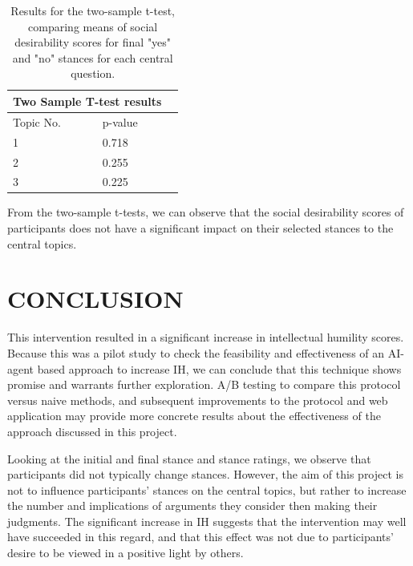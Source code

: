\documentclass[journal]{IEEEtran}
\begin{document}
\begin{table}[ht]
    \centering
    \begin{tabular}{llr}
\hline
\multicolumn{2}{c}{\textbf{Two Sample T-test results}} \\
\hline
Topic No.    & p-value \\
\hline
1   &   0.718   \\
2   &   0.255   \\
3   &   0.225   \\
\hline
\end{tabular}
    \caption{Results for the two-sample t-test, comparing means of social desirability scores for final "yes" and "no" stances for each central question.}
    \label{tab:twosample-ttest-post-results}
\end{table}

From the two-sample t-tests, we can observe that the social desirability scores of participants does not have a significant impact on their selected stances to the central topics.


\section{CONCLUSION}

This intervention resulted in a significant increase in intellectual humility scores. Because this was a pilot study to check the feasibility and effectiveness of an AI-agent based approach to increase IH, we can conclude that this technique shows promise and warrants further exploration. A/B testing to compare this protocol versus naive methods, and subsequent improvements to the protocol and web application may provide more concrete results about the effectiveness of the approach discussed in this project.

Looking at the initial and final stance and stance ratings, we observe that participants did not typically change stances. However, the aim of this project is not to influence participants' stances on the central topics, but rather to increase the number and implications of arguments they consider then making their judgments. The significant increase in IH suggests that the intervention may well have succeeded in this regard, and that this effect was not due to participants' desire to be viewed in a positive light by others.




\balance

\end{document}
